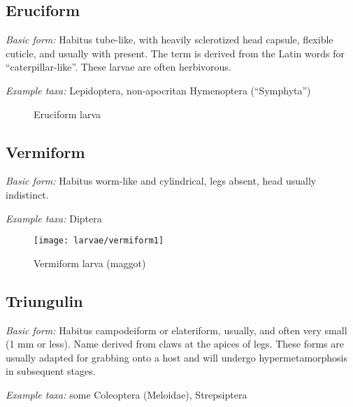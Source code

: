\subsection{Eruciform}%
\noindent{}\textit{Basic form:} Habitus tube-like, with heavily sclerotized head capsule, flexible cuticle, and usually with  present. The term is derived from the Latin words for ``caterpillar-like''. These larvae are often herbivorous.\vspace{3mm}

\noindent{}\textit{Example taxa:} Lepidoptera, non-apocritan Hymenoptera (``Symphyta'')\vspace{3mm}

\begin{figure}[ht!]
  \centering
  \caption{Eruciform larva \citep[redrawn from][Plate VII]{fawcett1901notes}}
  \label{fig:eruciform1}
\end{figure}

\subsection{Vermiform}
\noindent{}\textit{Basic form:} Habitus worm-like and cylindrical, legs absent, head usually indistinct.\vspace{3mm}

\noindent{}\textit{Example taxa:} Diptera\vspace{3mm}

\begin{figure}[ht!]
  \centering
    \texttt{[image: larvae/vermiform1]}
  \caption{Vermiform larva (maggot) \citep[redrawn from][Fig. 4a]{bhlitem92397tringulin}}
  \label{fig:triungulin}
\end{figure}

\subsection{Triungulin}
\noindent{}\textit{Basic form:} Habitus campodeiform or elateriform, usually, and often very small (1 mm or less). Name derived from claws at the apices of legs. These forms are usually adapted for grabbing onto a host and will undergo hypermetamorphosis in subsequent stages.\vspace{3mm}

\noindent{}\textit{Example taxa:} some Coleoptera (Meloidae), Strepsiptera\vspace{3mm}

